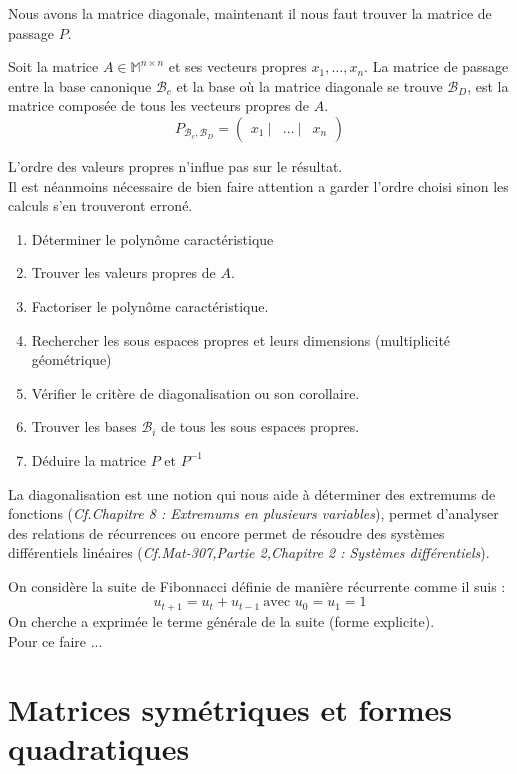 Nous avons la matrice diagonale, maintenant il nous faut trouver la matrice de passage $P$.
\begin{prop}
Soit la matrice $A\in\mathbb{M}^{n\times n}$ et ses vecteurs propres $x_1,\hdots,x_n$.
La matrice de passage entre la base canonique $\mathscr{B}_c$ et la base où la matrice diagonale se trouve $\mathscr{B}_D$, est la matrice composée de tous les vecteurs propres de $A$.
$$P_{\mathscr{B}_c,\mathscr{B}_D}=\begin{pmatrix}x_1\ |& \hdots\ | & x_n\end{pmatrix}$$
\end{prop}

L'ordre des valeurs propres n'influe pas sur le résultat.\\
Il est néanmoins nécessaire de bien faire attention a garder l'ordre choisi sinon les calculs s'en trouveront erroné.
\begin{meth}
\begin{enumerate}
    \item Déterminer le polynôme caractéristique
    \item Trouver les valeurs propres de $A$.
    \item Factoriser le polynôme caractéristique.
    \item Rechercher les sous espaces propres et leurs dimensions (multiplicité géométrique)
    \item Vérifier le critère de diagonalisation ou son corollaire.
    \item Trouver les bases $\mathscr{B}_i$ de tous les sous espaces propres.
    \item Déduire la matrice $P$ et $P^{-1}$
\end{enumerate}
\end{meth}
La diagonalisation est une notion qui nous aide à déterminer des extremums de fonctions (\textit{Cf.Chapitre 8 : Extremums en plusieurs variables}), permet d'analyser des relations de récurrences ou encore permet de résoudre des systèmes différentiels linéaires (\textit{Cf.Mat-307,Partie 2,Chapitre 2 : Systèmes différentiels}). 
\begin{ex}
On considère la suite de Fibonnacci définie de manière récurrente comme il suis : 
$$u_{t+1}=u_{t}+u_{t-1}\ \text{avec } u_0=u_1=1$$
On cherche a exprimée le terme générale de la suite (forme explicite).\\
Pour ce faire ...
\end{ex}
\section{Matrices symétriques et formes quadratiques}
